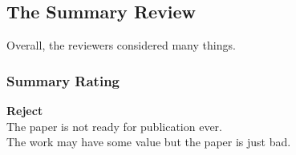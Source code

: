 
\subsection{The Summary Review}
Overall, the reviewers considered many things.

\subsubsection*{Summary Rating}
\textbf{Reject} \\
The paper is not ready for publication ever. \\
The work may have some value but the paper is just bad.

